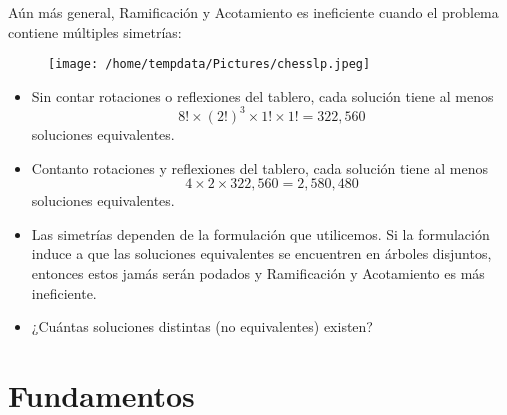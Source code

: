 \documentclass[aspectratio=169,professionalfonts]{beamer}
\begin{document}
\begin{frame}
	Aún más general, Ramificación y Acotamiento es ineficiente cuando el
	problema contiene múltiples simetrías:
	\begin{figure}
		\texttt{[image: /home/tempdata/Pictures/chesslp.jpeg]}
	\end{figure}
\end{frame}

\begin{frame}
	\begin{itemize}
		\item Sin contar rotaciones o reflexiones del tablero, cada solución
			tiene al menos
		\begin{equation*}
			8! \times (2!)^3 \times 1! \times 1! = 322{,}560
		\end{equation*}
		soluciones equivalentes.
		\item Contanto rotaciones y reflexiones del tablero, cada solución
			tiene al menos
		\begin{equation*}
			4 \times 2 \times 322{,}560 = 2{,}580{,}480
		\end{equation*}
		soluciones equivalentes.
		\item Las simetrías dependen de la formulación que utilicemos. Si la
			formulación induce a que las soluciones equivalentes se encuentren
			en árboles disjuntos, entonces estos jamás serán podados y
			Ramificación y Acotamiento es más ineficiente.
		\item ¿Cuántas soluciones distintas (no equivalentes) existen?
	\end{itemize}
\end{frame}



\section{Fundamentos}
\end{document}

